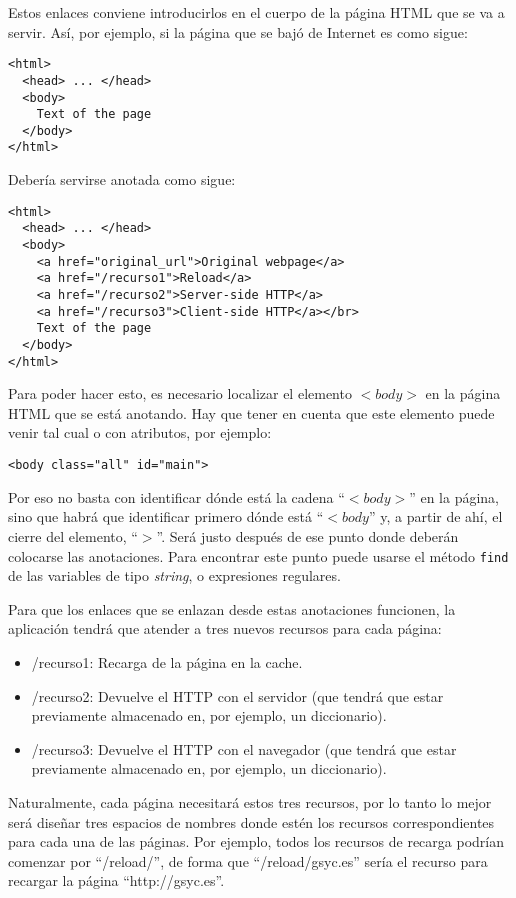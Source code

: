 Estos enlaces conviene introducirlos en el cuerpo de la página HTML que se va a servir. Así, por ejemplo, si la página que se bajó de Internet es como sigue:

\begin{verbatim}
<html>
  <head> ... </head>
  <body>
    Text of the page
  </body>
</html>
\end{verbatim}

Debería servirse anotada como sigue:

\begin{verbatim}
<html>
  <head> ... </head>
  <body>
    <a href="original_url">Original webpage</a>
    <a href="/recurso1">Reload</a>
    <a href="/recurso2">Server-side HTTP</a>
    <a href="/recurso3">Client-side HTTP</a></br>
    Text of the page
  </body>
</html>
\end{verbatim}

Para poder hacer esto, es necesario localizar el elemento $<body>$ en la página HTML que se está anotando. Hay que tener en cuenta que este elemento puede venir tal cual o con atributos, por ejemplo:

\begin{verbatim}
<body class="all" id="main">
\end{verbatim}

Por eso no basta con identificar dónde está la cadena ``$<body>$'' en la página, sino que habrá que identificar primero dónde está ``$<body$'' y, a partir de ahí, el cierre del elemento, ``$>$''. Será justo después de ese punto donde deberán colocarse las anotaciones. Para encontrar este punto puede usarse el método \texttt{find} de las variables de tipo \emph{string}, o expresiones regulares.

Para que los enlaces que se enlazan desde estas anotaciones funcionen, la aplicación tendrá que atender a tres nuevos recursos para cada página:

\begin{itemize}
\item /recurso1: Recarga de la página en la cache.
\item /recurso2: Devuelve el HTTP con el servidor (que tendrá que estar previamente almacenado en, por ejemplo, un diccionario).
\item /recurso3: Devuelve el HTTP con el navegador (que tendrá que estar previamente almacenado en, por ejemplo, un diccionario).
\end{itemize}

Naturalmente, cada página necesitará estos tres recursos, por lo tanto lo mejor será diseñar tres espacios de nombres donde estén los recursos correspondientes para cada una de las páginas. Por ejemplo, todos los recursos de recarga podrían comenzar por ``/reload/'', de forma que ``/reload/gsyc.es'' sería el recurso para recargar la página ``http://gsyc.es''.

